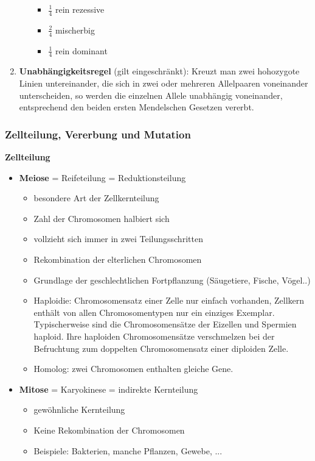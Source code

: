 \begin{enumerate}
\begin{itemize}
		\begin{itemize}
			\item $\frac{1}{4}$ rein rezessive
			\item $\frac{2}{4}$ mischerbig
			\item $\frac{1}{4}$ rein dominant
		\end{itemize}
	\end{itemize}
	\item \textbf{Unabhängigkeitsregel} (gilt eingeschränkt):
	Kreuzt man zwei hohozygote Linien untereinander, die sich in zwei oder mehreren Allelpaaren voneinander unterscheiden, so werden die einzelnen Allele unabhängig voneinander, entsprechend den beiden ersten Mendelschen Gesetzen vererbt.
\end{enumerate}

\subsubsection{Zellteilung, Vererbung und Mutation}
\textbf{Zellteilung}
\begin{itemize}
	\item \textbf{Meiose} = Reifeteilung = Reduktionsteilung
	\begin{itemize}
		\item besondere Art der Zellkernteilung
		\item Zahl der Chromosomen halbiert sich
		\item vollzieht sich immer in zwei Teilungsschritten
		\item Rekombination der elterlichen Chromosomen
		\item Grundlage der geschlechtlichen Fortpflanzung (Säugetiere, Fische, Vögel..)
		\item Haploidie: Chromosomensatz einer Zelle nur einfach vorhanden, Zellkern enthält von allen Chromosomentypen nur ein einziges Exemplar.
		Typischerweise sind die Chromosomensätze der Eizellen und Spermien haploid. Ihre haploiden Chromosomensätze verschmelzen bei der Befruchtung zum doppelten Chromosomensatz einer diploiden Zelle.
		\item Homolog: zwei Chromosomen enthalten gleiche Gene.
	\end{itemize}
	\item \textbf{Mitose} = Karyokinese = indirekte Kernteilung
	\begin{itemize}
		\item gewöhnliche Kernteilung
		\item Keine Rekombination der Chromosomen
		\item Beispiele: Bakterien, manche Pflanzen, Gewebe, ...
	\end{itemize}
\end{itemize}
